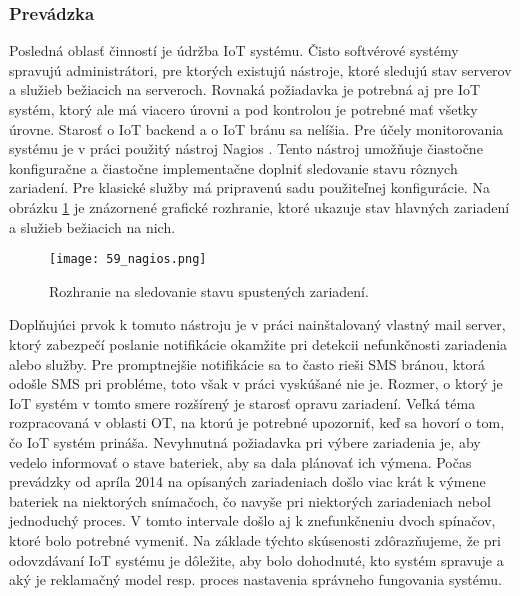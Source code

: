 \subsubsection{Prevádzka}
Posledná oblasť činností je údržba IoT systému. Čisto softvérové systémy spravujú administrátori, pre ktorých existujú nástroje, ktoré sledujú stav serverov a služieb bežiacich na serveroch. Rovnaká požiadavka je potrebná aj pre IoT systém, ktorý ale má viacero úrovni a pod kontrolou je potrebné mať všetky úrovne. Starosť o IoT backend a o IoT bránu sa nelíšia. Pre účely monitorovania systému je v práci použitý nástroj Nagios \cite{IOT35}. Tento nástroj umožňuje čiastočne konfiguračne a čiastočne implementačne doplniť sledovanie stavu rôznych zariadení. Pre klasické služby má pripravenú sadu použiteľnej konfigurácie. Na obrázku \ref{59_nagios} je znázornené grafické rozhranie, ktoré ukazuje stav hlavných zariadení a služieb bežiacich na nich.
\begin{figure}[!htbp]
\centering
\texttt{[image: 59\_nagios.png]}
\caption{Rozhranie na sledovanie stavu spustených zariadení.}
\label{59_nagios}
\end{figure}
Doplňujúci prvok k tomuto nástroju je v práci nainštalovaný vlastný mail server, ktorý zabezpečí poslanie notifikácie okamžite pri detekcii nefunkčnosti zariadenia alebo služby. Pre promptnejšie notifikácie sa to často rieši SMS bránou, ktorá odošle SMS pri probléme, toto však v práci vyskúšané nie je. Rozmer, o ktorý je IoT systém v tomto smere rozšírený je starosť opravu zariadení. Veľká téma rozpracovaná v oblasti OT, na ktorú je potrebné upozorniť, keď sa hovorí o tom, čo IoT systém prináša. Nevyhnutná požiadavka pri výbere zariadenia je, aby vedelo informovať o stave bateriek, aby sa dala plánovať ich výmena. Počas prevádzky od apríla 2014 na opísaných zariadeniach došlo viac krát k výmene bateriek na niektorých snímačoch, čo navyše pri niektorých zariadeniach nebol jednoduchý proces. V tomto intervale došlo aj k znefunkčneniu dvoch spínačov, ktoré bolo potrebné vymeniť. Na základe týchto skúsenosti zdôrazňujeme, že pri odovzdávaní IoT systému je dôležite, aby bolo dohodnuté, kto systém spravuje a aký je reklamačný model resp. proces nastavenia správneho fungovania systému.
